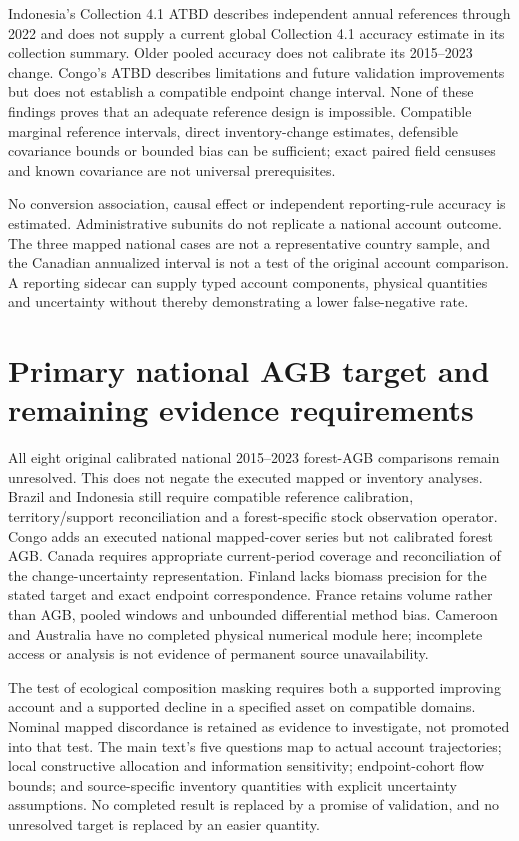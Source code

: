 Indonesia's Collection 4.1 ATBD describes independent annual references through 2022 and does not supply a current global Collection 4.1 accuracy estimate in its collection summary. Older pooled accuracy does not calibrate its 2015--2023 change. Congo's ATBD describes limitations and future validation improvements but does not establish a compatible endpoint change interval. None of these findings proves that an adequate reference design is impossible. Compatible marginal reference intervals, direct inventory-change estimates, defensible covariance bounds or bounded bias can be sufficient; exact paired field censuses and known covariance are not universal prerequisites.

No conversion association, causal effect or independent reporting-rule accuracy is estimated. Administrative subunits do not replicate a national account outcome. The three mapped national cases are not a representative country sample, and the Canadian annualized interval is not a test of the original account comparison. A reporting sidecar can supply typed account components, physical quantities and uncertainty without thereby demonstrating a lower false-negative rate.

\section{Primary national AGB target and remaining evidence requirements}
All eight original calibrated national 2015--2023 forest-AGB comparisons remain unresolved. This does not negate the executed mapped or inventory analyses. Brazil and Indonesia still require compatible reference calibration, territory/support reconciliation and a forest-specific stock observation operator. Congo adds an executed national mapped-cover series but not calibrated forest AGB. Canada requires appropriate current-period coverage and reconciliation of the change-uncertainty representation. Finland lacks biomass precision for the stated target and exact endpoint correspondence. France retains volume rather than AGB, pooled windows and unbounded differential method bias. Cameroon and Australia have no completed physical numerical module here; incomplete access or analysis is not evidence of permanent source unavailability.

The test of ecological composition masking requires both a supported improving account and a supported decline in a specified asset on compatible domains. Nominal mapped discordance is retained as evidence to investigate, not promoted into that test. The main text's five questions map to actual account trajectories; local constructive allocation and information sensitivity; endpoint-cohort flow bounds; and source-specific inventory quantities with explicit uncertainty assumptions. No completed result is replaced by a promise of validation, and no unresolved target is replaced by an easier quantity.
